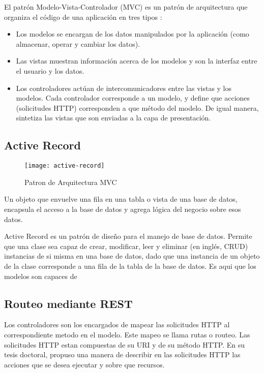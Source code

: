 El patrón Modelo-Vista-Controlador (MVC) es un patrón de arquitectura que organiza el código de una aplicación en tres tipos \cite{Fox2013-ct}:  
\begin{itemize}
    \item Los modelos se encargan de los datos manipulados por la aplicación (como almacenar, operar y cambiar los datos).
    \item Las vistas muestran información acerca de los modelos y son la interfaz entre el usuario y los datos. 
    \item Los controladores actúan de intercomunicadores entre las vistas y los modelos. Cada controlador corresponde a un modelo, y define que acciones (solicitudes HTTP) corresponden a que método del modelo. De igual manera, sintetiza las vistas que son enviadas a la capa de presentación.
\end{itemize}

\subsection{Active Record}
\begin{figure}[H]
        \centering
        \texttt{[image: active-record]}
        \caption{Patron de Arquitectura MVC \protect\cite{Fowler2012-az}}
        \label{fig:active-record}
    \end{figure}
\begin{displayquote}
Un objeto que envuelve una fila en una tabla o vista de una base de datos, encapsula el acceso a la base de datos y agrega lógica del negocio sobre esos datos. 
\cite{Fowler2012-az}
\end{displayquote}
Active Record es un patrón de diseño para el manejo de base de datos. Permite que una clase sea capaz de crear, modificar, leer y eliminar (en inglés, CRUD) instancias de si misma en una base de datos, dado que una instancia de un objeto de la clase corresponde a una fila de la tabla de la base de datos. Es aqui que los modelos son capaces de 

\subsection{Routeo mediante REST}

Los controladores son los encargados de mapear las solicitudes HTTP al correspondiente metodo en el modelo. Este mapeo se llama rutas o routeo. Las solicitudes HTTP estan compuestas de su URI y de su método HTTP. En su tesis doctoral,  propuso una manera de describir en las solicitudes HTTP las acciones que se desea ejecutar y sobre que recursos.

